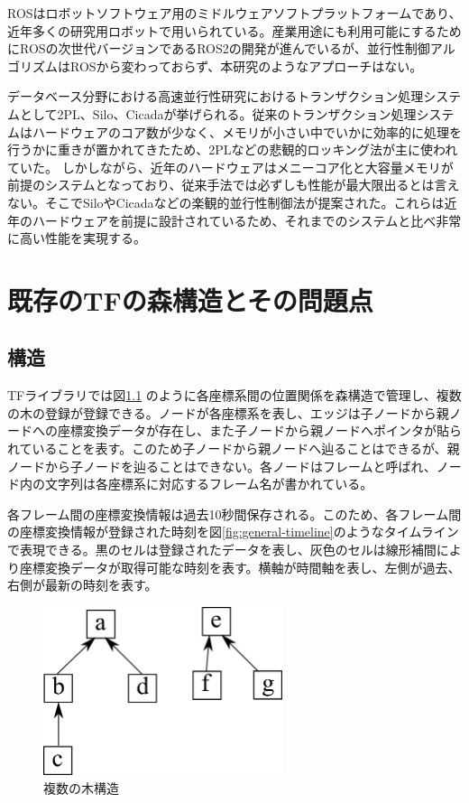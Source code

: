 \documentclass[a4paper]{jreport}	%
\begin{document}

ROSはロボットソフトウェア用のミドルウェアソフトプラットフォームであり、近年多くの研究用ロボットで用いられている。産業用途にも利用可能にするためにROSの次世代バージョンであるROS2\cite{ros2}の開発が進んでいるが、並行性制御アルゴリズムはROSから変わっておらず、本研究のようなアプローチはない。

データベース分野における高速並行性研究におけるトランザクション処理システムとして2PL、Silo、Cicadaが挙げられる。従来のトランザクション処理システムはハードウェアのコア数が少なく、メモリが小さい中でいかに効率的に処理を行うかに重きが置かれてきたため、2PLなどの悲観的ロッキング法が主に使われていた。
しかしながら、近年のハードウェアはメニーコア化と大容量メモリが前提のシステムとなっており、従来手法では必ずしも性能が最大限出るとは言えない。そこでSilo\cite{silo}やCicada\cite{Cicada}などの楽観的並行性制御法が提案された。これらは近年のハードウェアを前提に設計されているため、それまでのシステムと比べ非常に高い性能を実現する。

\chapter{既存のTFの森構造とその問題点}
\section{構造}
TFライブラリでは図\ref{fig:multitree} のように各座標系間の位置関係を森構造で管理し、複数の木の登録が登録できる。ノードが各座標系を表し、エッジは子ノードから親ノードへの座標変換データが存在し、また子ノードから親ノードへポインタが貼られていることを表す。このため子ノードから親ノードへ辿ることはできるが、親ノードから子ノードを辿ることはできない。各ノードはフレームと呼ばれ、ノード内の文字列は各座標系に対応するフレーム名が書かれている。

各フレーム間の座標変換情報は過去10秒間保存される。このため、各フレーム間の座標変換情報が登録された時刻を図\ref{fig:general-timeline}のようなタイムラインで表現できる。黒のセルは登録されたデータを表し、灰色のセルは線形補間により座標変換データが取得可能な時刻を表す。横軸が時間軸を表し、左側が過去、右側が最新の時刻を表す。

\begin{figure}[h] 
\centering
\includegraphics[width=7cm]{multitree.png}	
\caption{複数の木構造}
\label{fig:multitree}
\end{figure}
\end{document}
